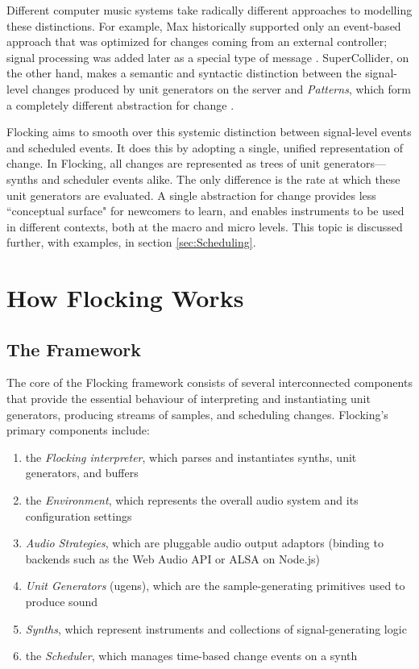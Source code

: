 \documentclass{article}
\begin{document}
Different computer music systems take radically different approaches to modelling these distinctions. For example, Max historically supported only an event-based approach that was optimized for changes coming from an external controller; signal processing was added later as a special type of message \cite{puckette2002max}.
SuperCollider, on the other hand, makes a semantic and syntactic distinction between the signal-level changes produced by unit generators on the server \cite{mccartney1996supercollider} and {\it Patterns}, which form a completely different abstraction for change \cite[pp. 189]{wilson2011supercollider}.

Flocking aims to smooth over this systemic distinction between signal-level events and scheduled events. It does this by adopting a single, unified representation of change. In Flocking, all changes are represented as trees of unit generators---synths and scheduler events alike. The only difference is the rate at which these unit generators are evaluated. A single abstraction for change provides less ``conceptual surface" for newcomers to learn, and enables instruments to be used in different contexts, both at the macro and micro levels. This topic is discussed further, with examples, in section \ref{sec:Scheduling}.

\section{How Flocking Works}

\subsection{The Framework}

The core of the Flocking framework consists of several interconnected components that provide the essential behaviour of interpreting and instantiating unit generators, producing streams of samples, and scheduling changes. Flocking's primary components include:

\begin{enumerate}
\item the {\it Flocking interpreter}, which parses and instantiates synths, unit generators, and buffers
\item the {\it Environment}, which represents the overall audio system and its configuration settings
\item {\it Audio Strategies}, which are pluggable audio output adaptors (binding to backends such as the Web Audio API or ALSA on Node.js)
\item {\it Unit Generators} (ugens), which are the sample-generating primitives used to produce sound
\item {\it Synths}, which represent instruments and collections of signal-generating logic
\item the {\it Scheduler}, which manages time-based change events on a synth
\end{enumerate}
\end{document}
